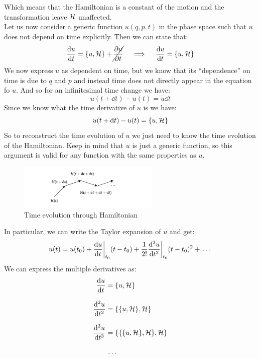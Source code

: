 Which means that the Hamiltonian is a constant of the motion and the transformation leave $\mathcal{H}$ unaffected.\\
Let us now consider a generic function $u(q,p,t)$ in the phase space such that $u$ does not depend on time explicitly. Then we can state that:
\begin{equation}
  \dv{u}{t} = \pb{u}{\hamfun} + \cancel{\pdv{u}{t}} \quad \implies \quad  \dv{u}{t} = \pb{u}{\hamfun}
\end{equation}
We now express $u$ as dependent on time, but we know that its ``dependence'' on time is due to $q$ and $p$ and instead time does not directly appear in the equation fo $u$. And so for an infinitesimal time change we have:
\begin{equation}
  u(t+\dd{t}) - u(t) = \dot{u}\dd{t}
\end{equation}
Since we know what the time derivative of $u$ is we have:
\begin{equation}
  u(t+\dd{t}) - u(t) = \pb{u}{\hamfun}
\end{equation}
So to reconstruct the time evolution of $u$ we just need to know the time evolution of the Hamiltonian. Keep in mind that $u$ is just a generic function, so this argument is valid for any function with the same properties as $u$.
\begin{figure}[H]
  \centering
  \includegraphics[width=0.6\textwidth]{res/svg/hamiltonian_time_evolution.drawio}
  \caption{Time evolution through Hamiltonian}
\end{figure}
In particular, we can write the Taylor expansion of $u$ and get:
\begin{equation}
  u(t) = u(t_0) + \dv{u}{t}\bigg|_{t_0} (t - t_0) + \frac{1}{2!} \dv[2]{u}{t}\bigg|_{t_0} (t - t_0)^2 +  \,\dots\,
\end{equation}
We can express the multiple derivatives as:
\begin{equation}
  \begin{split}
    \dv{u}{t} &= \pb{u}{\hamfun}\\[8pt]
    \dv[2]{u}{t} &= \pb{\pb{u}{\hamfun}}{\hamfun}\\[8pt]
    \dv[3]{u}{t} &= \pb{\pb{\pb{u}{\hamfun}}{\hamfun}}{\hamfun}\\[8pt]
    & \,\dots\,
  \end{split}
\end{equation}
